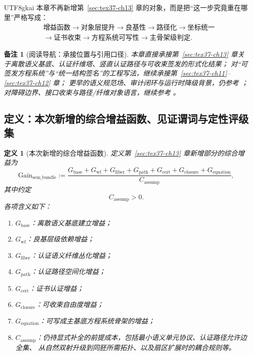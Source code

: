 \documentclass[12pt]{article}
\newtheorem{definition}{定义}[section]
\newtheorem{remark}{备注}[section]
\begin{document}
\begin{CJK*}{UTF8}{gkai}
本章不再新增第~\ref{sec:tex37-ch13} 章的对象，而是把“这一步究竟重在哪里”严格写成：
\[
  \begin{aligned}
    &\text{增益函数}
    \to
    \text{对象层提升}
    \to
    \text{良基性}
    \to
    \text{路径化}
    \to
    \text{坐标统一}\\
    &\to
    \text{证书收束}
    \to
    \text{方程系统可写性}
    \to
    \text{主骨架级判定}.
  \end{aligned}
\]

\begin{remark}[阅读导航：承接位置与引用口径]
本章直接承接第~\ref{sec:tex37-ch13} 章关于离散语义基底、认证纤维塔、竖直认证路径与可收束签发的形式化结果；
对“可签发方程系统”与“统一结构签名”的工程写法，继续承接第~\ref{sec:tex37-ch11}--\ref{sec:tex37-ch12} 章；
更早的语义规范场、审计闭环与运行时降级背景，仍参考 \cite{RepoTex20SemanticGaugeNormalization,RepoTex21AuditedWrapper,RepoTex23SemanticBase}；
对障碍边界、接口收束与路径/纤维对象语言，继续参考 \cite{RepoTex29RepairableObstruction,RepoTex35ExtendedCertificationTower,
  RepoTex36HomotopyTwistBijection,GaoZhengAppVol3,GaoZheng2025GFramework}。
\end{remark}

\subsection{定义：本次新增的综合增益函数、见证谓词与定性评级集}
\label{subsec:tex37-ch14-def}

\begin{definition}[本次新增的综合增益函数]
\label{def:tex37-ch14-gain}
定义第~\ref{sec:tex37-ch13} 章新增部分的综合增益为
\[
  \mathrm{Gain}_{\mathrm{sem\_bundle}}
  :=
  \frac{
    G_{\mathrm{base}}
    +
    G_{\mathrm{wf}}
    +
    G_{\mathrm{fiber}}
    +
    G_{\mathrm{path}}
    +
    G_{\mathrm{cert}}
    +
    G_{\mathrm{closure}}
    +
    G_{\mathrm{equation}}
  }{
    C_{\mathrm{assump}}
  },
\]
其中约定
\[
  C_{\mathrm{assump}}>0.
\]
各项含义如下：
\begin{enumerate}
  \item $G_{\mathrm{base}}$：离散语义基底建立增益；
  \item $G_{\mathrm{wf}}$：良基层级依赖增益；
  \item $G_{\mathrm{fiber}}$：认证语义纤维丛化增益；
  \item $G_{\mathrm{path}}$：认证路径空间化增益；
  \item $G_{\mathrm{cert}}$：证书认证增益；
  \item $G_{\mathrm{closure}}$：可收束自由度增益；
  \item $G_{\mathrm{equation}}$：可写成主基底方程系统骨架的增益；
  \item $C_{\mathrm{assump}}$：仍待显式补全的前提成本，包括最小语义单元协议、认证路径允许边全集、
  从自然双射升级到同胚所需拓扑、以及扇区扩展时的耦合规则等。
\end{enumerate}
\end{definition}


\end{CJK*}
\end{document}
